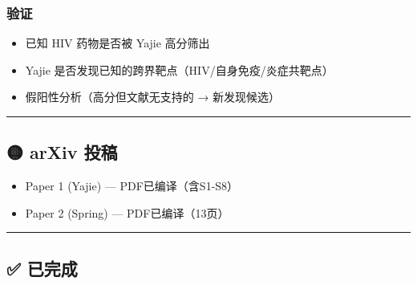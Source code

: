 \documentclass[
  12pt,
]{ctexart}
\providecommand{\tightlist}{%
  \setlength{\itemsep}{0pt}\setlength{\parskip}{0pt}}
\begin{document}
\subsubsection{验证}\label{ux9a8cux8bc1}

\begin{itemize}
\tightlist
\item[$\square$]
  已知 HIV 药物是否被 Yajie 高分筛出
\item[$\square$]
  Yajie 是否发现已知的跨界靶点（HIV/自身免疫/炎症共靶点）
\item[$\square$]
  假阳性分析（高分但文献无支持的 → 新发现候选）
\end{itemize}

\begin{center}\rule{0.5\linewidth}{0.5pt}\end{center}

\subsection{🟡 arXiv 投稿}\label{arxiv-ux6295ux7a3f}

\begin{itemize}
\tightlist
\item[$\square$]
  Paper 1 (Yajie) --- PDF已编译（含S1-S8）
\item[$\square$]
  Paper 2 (Spring) --- PDF已编译（13页）
\end{itemize}

\begin{center}\rule{0.5\linewidth}{0.5pt}\end{center}

\subsection{✅ 已完成}\label{ux5df2ux5b8cux6210}
\end{document}
